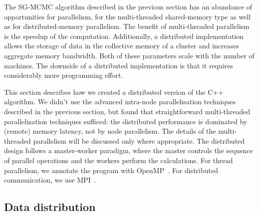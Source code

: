 \begin{comment}
- pi storage: DKV
   . pi/phi is read in 3), 4), 5a), 7)
   . pi is written in 4); read[i], then write[i], so no other data dependencies
   . so access is very synchronous: either read-only, or write without
     concurrent readers
   . DKV store properties:
      - single-sized keys
      - contiguous key space (integers 0..N-1)
      - update-only writes: no new KVs, no deletes
     so: no load imbalance, no hashing that is worth its name
      - no read/write or write/write concurrency
     so:
      - build RDMA store with remote reads and remote writes only, with exactly
        one RDMA transaction per read or write
\end{comment}



The SG-MCMC algorithm described in the previous section has an abundance of
opportunities for parallelism, for the multi-threaded shared-memory type as
well as for distributed-memory parallelism. The benefit of multi-threaded
parallelism is the speedup of the computation. Additionally, a distributed implementation
allows the storage of data in the collective memory of a cluster
and increases aggregate memory bandwidth. Both of these parameters scale with the number of
machines. The downside of a distributed implementation is that it requires
considerably more programming effort.


This section describes how we created a distributed version of the C++
algorithm. We didn't use the advanced intra-node parallelisation techniques
described in the previous section, but found that straightforward
multi-threaded parallelization techniques sufficed: the distributed performance
is dominated by (remote) memory latency, not by node parallelism.
The details of the multi-threaded parallelism
will be discussed only where appropriate. The
distributed design follows a master-worker paradigm, where
the master controls the sequence of parallel operations and the workers perform the
calculations. For thread parallelism, we annotate the program with
OpenMP~\cite{OpenMPSpec}. For distributed communication, we use
MPI~\cite{Forum:1994:MMI:898758}.


\subsection{Data distribution}


